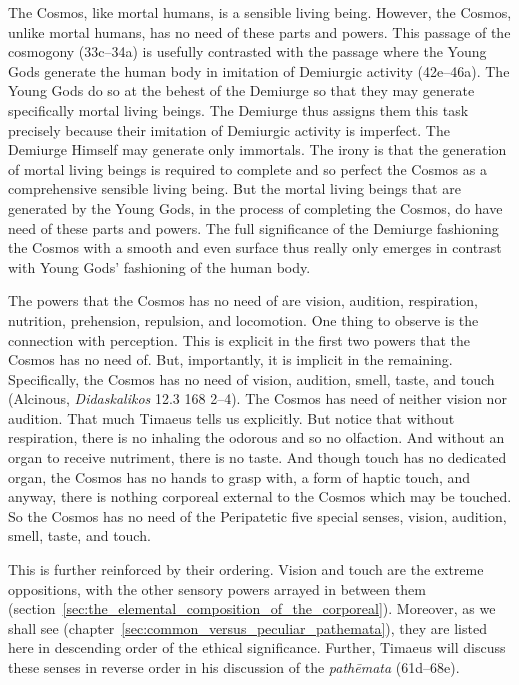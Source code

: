 The Cosmos, like mortal humans, is a sensible living being. However, the Cosmos, unlike mortal humans, has no need of these parts and powers. This passage of the cosmogony (33c--34a) is usefully contrasted with the passage where the Young Gods generate the human body in imitation of Demiurgic activity (42e--46a). The Young Gods do so at the behest of the Demiurge so that they may generate specifically mortal living beings. The Demiurge thus assigns them this task precisely because their imitation of Demiurgic activity is imperfect. The Demiurge Himself may generate only immortals. The irony is that the generation of mortal living beings is required to complete and so perfect the Cosmos as a comprehensive sensible living being. But the mortal living beings that are generated by the Young Gods, in the process of completing the Cosmos, do have need of these parts and powers. The full significance of the Demiurge fashioning the Cosmos with a smooth and even surface thus really only emerges in contrast with Young Gods' fashioning of the human body. 

The powers that the Cosmos has no need of are vision, audition, respiration, nutrition, prehension, repulsion, and locomotion. One thing to observe is the connection with perception. This is explicit in the first two powers that the Cosmos has no need of. But, importantly, it is implicit in the remaining. Specifically, the Cosmos has no need of vision, audition, smell, taste, and touch (Alcinous, \emph{Didaskalikos} 12.3 168 2--4). The Cosmos has need of neither vision nor audition. That much Timaeus tells us explicitly. But notice that without respiration, there is no inhaling the odorous and so no olfaction. And without an organ to receive nutriment, there is no taste. And though touch has no dedicated organ, the Cosmos has no hands to grasp with, a form of haptic touch, and anyway, there is nothing corporeal external to the Cosmos which may be touched. So the Cosmos has no need of the Peripatetic five special senses, vision, audition, smell, taste, and touch. 

This is further reinforced by their ordering. Vision and touch are the extreme oppositions, with the other sensory powers arrayed in between them (section~\ref{sec:the_elemental_composition_of_the_corporeal}). Moreover, as we shall see (chapter~\ref{sec:common_versus_peculiar_pathemata}), they are listed here in descending order of the ethical significance. Further, Timaeus will discuss these senses in reverse order in his discussion of the \emph{pathēmata} (61d--68e). 

